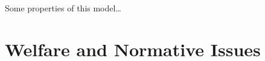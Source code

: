 \documentclass[pdftex,12pt]{article}
\begin{document}
Some properties of this model\ldots

\newpage

\section{Welfare and Normative Issues}





\newpage

\small

\end{document}
